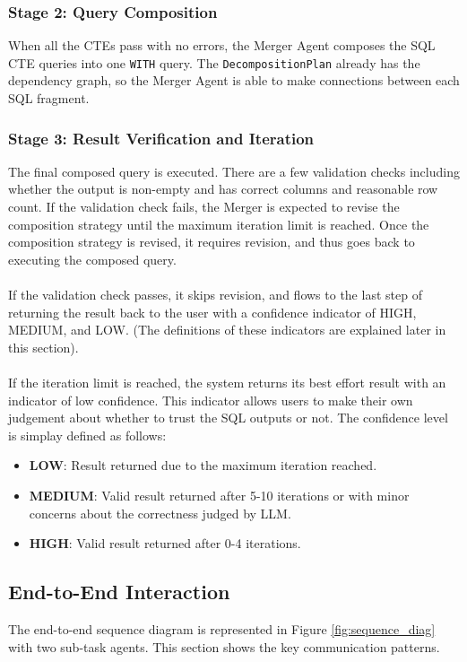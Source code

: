 \subsubsection{Stage 2: Query Composition}
When all the CTEs pass with no errors, the Merger Agent composes the SQL CTE queries into one \texttt{WITH} query. The \texttt{DecompositionPlan} already has the dependency graph, so the Merger Agent is able to make connections between each SQL fragment.
\subsubsection{Stage 3: Result Verification and Iteration}
The final composed query is executed. There are a few validation checks including whether the output is non-empty and has correct columns and reasonable row count. If the validation check fails, the Merger is expected to revise the composition strategy until the maximum iteration limit is reached. Once the composition strategy is revised, it requires revision, and thus goes back to executing the composed query.
\\\\
If the validation check passes, it skips revision, and flows to the last step of returning the result back to the user with a confidence indicator of HIGH, MEDIUM, and LOW. (The definitions of these indicators are explained later in this section).
\\\\
If the iteration limit is reached, the system returns its best effort result with an indicator of low confidence. This indicator allows users to make their own judgement about whether to trust the SQL outputs or not. The confidence level is simplay defined as follows:
\begin{itemize}
    \item \textbf{LOW}: Result returned due to the maximum iteration reached.
    \item \textbf{MEDIUM}: Valid result returned after 5-10 iterations or with minor concerns about the correctness judged by LLM.
    \item \textbf{HIGH}: Valid result returned after 0-4 iterations.
\end{itemize}

\subsection{End-to-End Interaction}
The end-to-end sequence diagram is represented in Figure \ref{fig:sequence_diag} with two sub-task agents. This section shows the key communication patterns.
